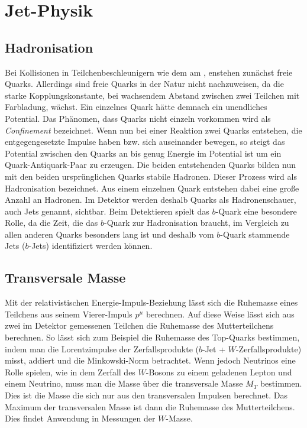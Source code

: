 \section{Jet-Physik}
\subsection{Hadronisation}
Bei Kollisionen in Teilchenbeschleunigern wie dem \lhc am \cern, enstehen zunächst freie Quarks. Allerdings sind freie Quarks in der Natur nicht nachzuweisen, da die starke Kopplungskonstante, bei wachsendem Abstand zwischen zwei Teilchen mit Farbladung, wächst. Ein einzelnes Quark hätte demnach ein unendliches Potential. Das Phänomen, dass Quarks nicht einzeln vorkommen wird als \emph{Confinement} bezeichnet. Wenn nun bei einer Reaktion zwei Quarks entstehen, die entgegengesetzte Impulse haben bzw. sich auseinander bewegen, so steigt das Potential zwischen den Quarks an bis genug Energie im Potential ist um ein Quark-Antiquark-Paar zu erzeugen. Die beiden entstehenden Quarks bilden nun mit den beiden ursprünglichen Quarks stabile Hadronen. Dieser Prozess wird als Hadronisation bezeichnet. Aus einem einzelnen Quark entstehen dabei eine große Anzahl an Hadronen. Im Detektor werden deshalb Quarks als Hadronenschauer, auch Jets genannt, sichtbar. Beim Detektieren spielt das $b$-Quark eine besondere Rolle, da die Zeit, die das $b$-Quark zur Hadronisation braucht, im Vergleich zu allen anderen Quarks besonders lang ist und deshalb vom $b$-Quark stammende Jets ($b$-Jets) identifiziert werden können.
\subsection{Transversale Masse}
Mit der relativistischen Energie-Impuls-Beziehung lässt sich die Ruhemasse eines Teilchens aus seinem Vierer-Impuls $p^\mu$ berechnen. Auf diese Weise lässt sich aus zwei im Detektor gemessenen Teilchen die Ruhemasse des Mutterteilchens berechnen. So lässt sich zum Beispiel die Ruhemasse des Top-Quarks bestimmen, indem man die Lorentzimpulse der Zerfallsprodukte ($b$-Jet + $W$-Zerfallsprodukte) misst, addiert und die Minkowski-Norm betrachtet. Wenn jedoch Neutrinos eine Rolle spielen, wie in dem Zerfall des $W$-Bosons zu einem geladenen Lepton und einem Neutrino, muss man die Masse über die transversale Masse $M_T$ bestimmen. Dies ist die Masse die sich nur aus den transversalen Impulsen berechnet. Das Maximum der transversalen Masse ist dann die Ruhemasse des Mutterteilchens. Dies findet Anwendung in Messungen der $W$-Masse.


